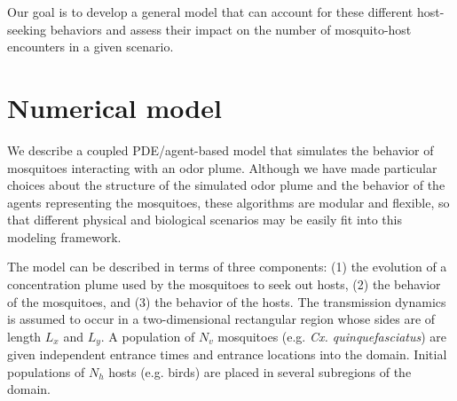 \documentclass[12pt]{article}
\newif\ifcommentsw
\newcommand{\comment}[1]{\ifcommentsw  $\blacktriangleright$\ \textbf{#1}\ $\blacktriangleleft$ \fi}
\begin{document}
Our goal is to develop a general model that can account for these different host-seeking behaviors and assess their impact on the number of mosquito-host encounters in a given scenario. 

\section{Numerical model}
	
	\comment{Bree: Add table of mathematical symbols. Maybe caps for dimensional functions, lowercase for nondimensional?}

	We describe a coupled PDE/agent-based model that simulates the behavior of mosquitoes interacting with an odor plume. Although we have made particular choices about the structure of the simulated odor plume and the behavior of the agents representing the mosquitoes, these algorithms are modular and flexible, so that different physical and biological scenarios may be easily fit into this modeling framework. 
	
	The model can be described in terms of three components: (1) the evolution of a concentration plume used by the mosquitoes to seek out hosts, (2) the behavior of the mosquitoes, and (3)  the behavior of the hosts.  The transmission dynamics is assumed to occur in a two-dimensional rectangular region whose sides are of length $L_x$ and $L_y$. A population of $N_v$ mosquitoes (e.g. {\sl Cx. quinquefasciatus}) are given independent entrance times and entrance locations into the domain. Initial populations of $N_h$ hosts (e.g. birds) are placed in several subregions of the domain.
	
	
\end{document}
